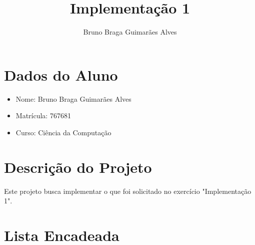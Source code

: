\documentclass{article}
\title{Implementação 1}
\author{Bruno Braga Guimarães Alves}
\date{}
\begin{document}
\maketitle

\section*{Dados do Aluno}
\begin{itemize}
    \item Nome: Bruno Braga Guimarães Alves
    \item Matrícula: 767681
    \item Curso: Ciência da Computação
\end{itemize}

\section*{Descrição do Projeto}
Este projeto busca implementar o que foi solicitado no exercício "Implementação 1".

\section*{Lista Encadeada}
\end{document}
